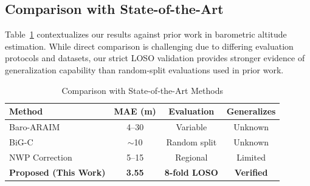 \subsection{Comparison with State-of-the-Art}

Table~\ref{tab:sota_comparison} contextualizes our results against prior work in barometric altitude estimation. While direct comparison is challenging due to differing evaluation protocols and datasets, our strict LOSO validation provides stronger evidence of generalization capability than random-split evaluations used in prior work.

\begin{table}[htbp]
\caption{Comparison with State-of-the-Art Methods}
\label{tab:sota_comparison}
\centering
\begin{tabular}{lccc}
\toprule
\textbf{Method} & \textbf{MAE (m)} & \textbf{Evaluation} & \textbf{Generalizes} \\
\midrule
Baro-ARAIM \cite{simonetti2024geodetic} & 4--30 & Variable & Unknown \\
BiG-C \cite{narayanan2022enhanced} & $\sim$10 & Random split & Unknown \\
NWP Correction \cite{schumann2017use} & 5--15 & Regional & Limited \\
\midrule
\textbf{Proposed (This Work)} & \textbf{3.55} & \textbf{8-fold LOSO} & \textbf{Verified} \\
\bottomrule
\end{tabular}
\end{table}
